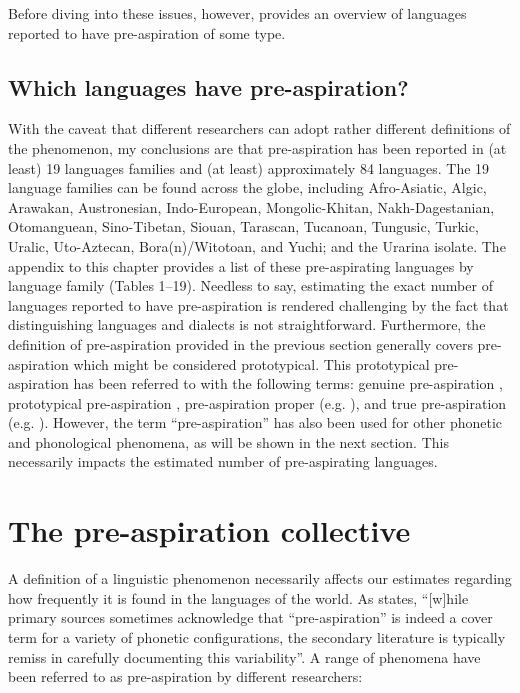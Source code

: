 \documentclass[output=paper]{langscibook}
\begin{document}
Before diving into these issues, however,  provides an overview of languages reported to have pre\hyp aspiration of some type.

\subsection{Which languages have pre-aspiration?}\label{sec:hejna:1.2}
\begin{sloppypar}
With the caveat that different researchers can adopt rather different definitions of the phenomenon, my conclusions are that pre\hyp aspiration has been reported in (at least) 19 languages families and (at least) approximately 84 languages. The 19 language families can be found across the globe, including Afro-Asiatic, Algic, Arawakan, Austronesian, Indo-European, Mongolic-Khitan, Nakh-Dagestanian, Otomanguean, Sino-Tibetan, Siouan, Tarascan, Tucanoan, Tungusic, Turkic, Uralic, Uto-Aztecan, Bora(n)/Witotoan, and Yuchi; and the Urarina isolate. The appendix to this chapter provides a list of these pre-aspirating languages by language family (Tables 1--19). Needless to say, estimating the exact number of languages reported to have pre\hyp aspiration is rendered challenging by the fact that distinguishing languages and dialects is not straightforward. Furthermore, the definition of pre\hyp aspiration provided in the previous section generally covers pre\hyp aspiration which might be considered prototypical. This prototypical pre\hyp aspiration has been referred to with the following terms: genuine pre\hyp aspiration \citep{Silverman2003}, prototypical pre\hyp aspiration \citep[86]{Clayton2010}, pre\hyp aspiration proper (e.g. \citealt{Helgason2002,Helgason2003}), and true pre\hyp aspiration (e.g. \cites[132]{TorresKasak2019}[24]{Helgason2002}[25]{KoremanEtAl2008}). However, the term “pre-aspiration” has also been used for other phonetic and phonological phenomena, as will be shown in the next section. This necessarily impacts the estimated number of pre-aspirating languages.
\end{sloppypar}

\section{The pre\hyp aspiration collective}\label{sec:hejna:2}

A definition of a linguistic phenomenon necessarily affects our estimates regarding how frequently it is found in the languages of the world. As \citet[576]{Silverman2003} states, “[w]hile primary sources sometimes acknowledge that “pre-aspiration” is indeed a cover term for a variety of phonetic configurations, the secondary literature is typically remiss in carefully documenting this variability”. A range of phenomena have been referred to as pre\hyp aspiration by different researchers:
\end{document}
